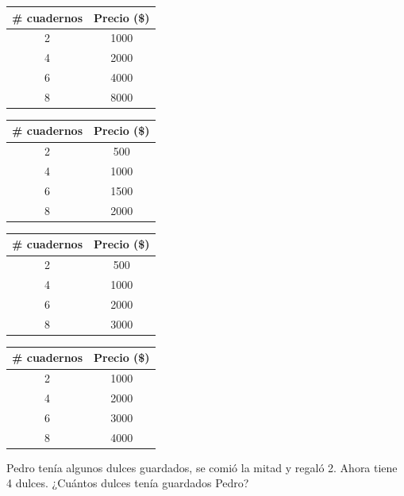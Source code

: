 \documentclass[10pt,addpoints]{exam}
\begin{document}
\begin{multicols}{2}
\begin{questions}
\begin{choices}
\choice \begin{tabular}{|c|c|}
\hline 
\# cuadernos & Precio (\$) \\ 
\hline 
2 & 1000 \\ 
\hline 
4 & 2000 \\ 
\hline 
6 & 4000 \\ 
\hline 
8 & 8000 \\ 
\hline 
\end{tabular}
\choice \begin{tabular}{|c|c|}
\hline 
\# cuadernos & Precio (\$) \\ 
\hline 
2 & 500 \\ 
\hline 
4 & 1000 \\ 
\hline 
6 & 1500 \\ 
\hline 
8 & 2000 \\ 
\hline 
\end{tabular} 
\choice \begin{tabular}{|c|c|}
\hline 
\# cuadernos & Precio (\$) \\ 
\hline 
2 & 500 \\ 
\hline 
4 & 1000 \\ 
\hline 
6 & 2000 \\ 
\hline 
8 & 3000 \\ 
\hline 
\end{tabular} 
\CorrectChoice \begin{tabular}{|c|c|}
\hline 
\# cuadernos & Precio (\$) \\ 
\hline 
2 & 1000 \\ 
\hline 
4 & 2000 \\ 
\hline 
6 & 3000 \\ 
\hline 
8 & 4000 \\ 
\hline 
\end{tabular} 
\end{choices}
\question Pedro tenía algunos dulces guardados, se comió la mitad y regaló 2. Ahora tiene 4 dulces. ¿Cuántos dulces tenía guardados Pedro?


\end{questions}
\end{multicols}
\end{document}
